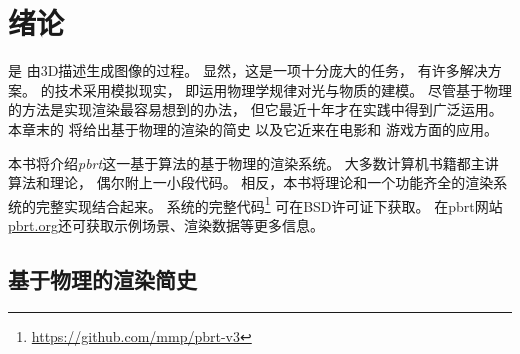 
\chapter{绪论}\label{chap:绪论}

是
由3D描述生成图像的过程。
显然，这是一项十分庞大的任务，
有许多解决方案。
的技术采用模拟现实，
即运用物理学规律对光与物质的建模。
尽管基于物理的方法是实现渲染最容易想到的办法，
但它最近十年才在实践中得到广泛运用。
本章末的
将给出基于物理的渲染的简史
以及它近来在电影和
游戏方面的应用。

本书将介绍\emph{pbrt}这一基于算法的基于物理的渲染系统。
大多数计算机书籍都主讲算法和理论，
偶尔附上一小段代码。
相反，本书将理论和一个功能齐全的渲染系统的完整实现结合起来。
系统的完整代码\footnote{\url{https://github.com/mmp/pbrt-v3}}
可在BSD许可证下获取。
在pbrt网站\href{https://pbrt.org}{\ttfamily pbrt.org}还可获取示例场景、渲染数据等更多信息。













\section{基于物理的渲染简史}\label{sec:基于物理的渲染简史}

